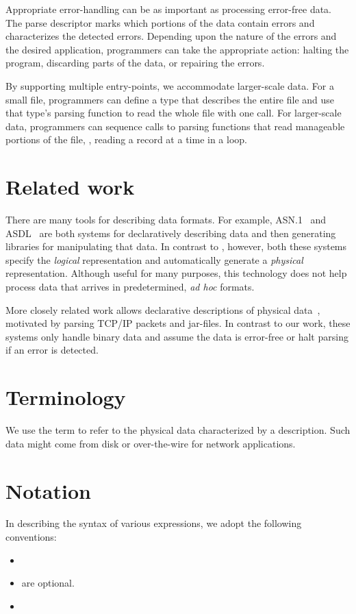 Appropriate error-handling can be as important as processing
error-free data.  The parse descriptor marks which portions of the
data contain errors and characterizes the detected errors.
Depending upon the nature of the errors and the desired application,
programmers can take the appropriate action: halting the program,
discarding parts of the data, or repairing the errors.

By supporting multiple entry-points, we accommodate larger-scale data.
For a small file, programmers can define a \PADSL{} type that describes
the entire file and use that type's parsing function to read the whole
file with one call.  For larger-scale data, programmers can sequence
calls to parsing functions that read manageable portions of the file,
\eg{}, reading a record at a time in a loop.

\section{Related work}
There are many tools for describing data formats. For example,
\textsc{ASN.1}~\cite{asn} and \textsc{ASDL}~\cite{asdl} are both
systems for declaratively describing data and then generating
libraries for manipulating that data.  In contrast to \PADS{},
however, both these systems specify the {\em logical\/} representation
and automatically generate a {\em physical\/} representation.
Although useful for many purposes, this technology does not help
process data that arrives in predetermined, \textit{ad hoc} formats.


More closely related work allows declarative descriptions of physical
data~\cite{sigcomm00,erlang-bit-syntax,gpce02}, motivated by parsing
\textsc{TCP/IP} packets and \java{} jar-files.  In contrast to our
work, these systems only handle binary data and assume the data is
error-free or halt parsing if an error is detected.  

\section{Terminology}
We use the term \textit{\external{}} to refer to the physical
data characterized by a \PADS{} description.  Such data might 
come from disk or over-the-wire for network applications.

\section{Notation}
In describing the syntax of various \PADSL{} expressions, we
adopt the following conventions:
\begin{itemize}
\item {}
\item {} are optional.
\item {}
\end{itemize}

